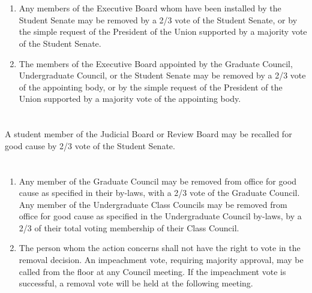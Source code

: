\documentclass{uniondoc}
\begin{document}
\section{}

\begin{enumerate}
	\item Any members of the Executive Board whom have been installed by the Student Senate may be removed by a 2/3 vote of the Student Senate, or by the simple request of the President of the Union supported by a majority vote of the Student Senate.
	\item The members of the Executive Board appointed by the Graduate Council, Undergraduate Council, or the Student Senate may be removed by a 2/3 vote of the appointing body, or by the simple request of the President of the Union supported by a majority vote of the appointing body.
\end{enumerate}

\section{}

A student member of the Judicial Board or Review Board may be recalled for good cause by 2/3 vote of the Student Senate.

\section{}

\begin{enumerate}
	\item Any member of the Graduate Council may be removed from office for good cause as specified in their by-laws, with a 2/3 vote of the Graduate Council. Any member of the Undergraduate Class Councils may be removed from office for good cause as specified in the Undergraduate Council by-laws, by a 2/3 of their total voting membership of their Class Council.
	\item The person whom the action concerns shall not have the right to vote in the removal decision. An impeachment vote, requiring majority approval, may be called from the floor at any Council meeting. If the impeachment vote is successful, a removal vote will be held at the following meeting.
\end{enumerate}


\section{}
\end{document}
